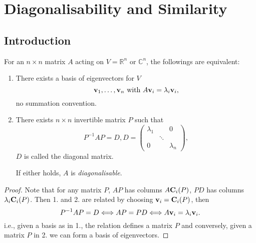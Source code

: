 \documentclass[10pt]{article}
\begin{document}
    \section{Diagonalisability and Similarity}
    \subsection{Introduction}
    \begin{proposition}
        For an $n\times n$ matrix $A$ acting on $V=\mathbb{R}^{n}$ or $ \mathbb{C}^{n} $, the followings are equivalent:
        \begin{enumerate}
            \item There exists a basis of eigenvectors for $V$
            \[
                {\bf v}_1,\dots,{\bf v}_n \text{ with }A{\bf v}_i=\lambda_i{\bf v}_i
            ,\]
            no summation convention.
            \item There exists $n\times n$ invertible matrix $P$ such that 
            \[
                P^{-1}AP=D, D=\begin{pmatrix}
                    \lambda_1&&0\\
                    &\ddots&\\
                    0&&\lambda_n
                \end{pmatrix}
            ,\]
            $D$ is called the diagonal matrix.

            If either holds, $A$ is \textit{diagonalisable}.
        \end{enumerate} 
    \end{proposition}
    \begin{proof}
        Note that for any matrix $P$, $AP$ has columns $ A{\bf C}_i(P) $, $PD$ has columns $ \lambda_i {\bf C}_i(P) $. Then 1. and 2. are related by choosing $ {\bf v}_i={\bf C}_i(P) $, then 
        \[
            P^{-1}AP=D \Longleftrightarrow AP=PD \Longleftrightarrow A{\bf v}_i=\lambda_i{\bf v}_i
        .\]
        i.e., given a basis as in 1., the relation defines a matrix $P$ and conversely, given a matrix $P$ in 2. we can form a basis of eigenvectors.
    \end{proof}
\end{document}
